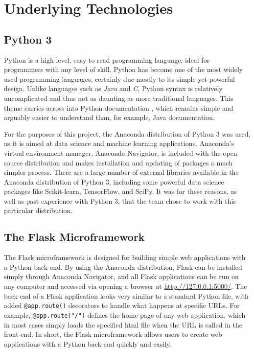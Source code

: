 \section{Underlying Technologies}\label{sectechnologies}

\subsection{Python 3}
Python is a high-level, easy to read programming language, ideal for programmers with any level of skill. Python has become one of the most widely used programming languages, certainly due mostly to its simple yet powerful design. Unlike languages such as \textit{Java} and \textit{C}, Python syntax is relatively uncomplicated and thus not as daunting as more traditional languages. This theme carries across into Python documentation \cite{pythondocs}, which remains simple and arguably easier to understand than, for example, Java documentation. 

For the purposes of this project, the Anaconda distribution \cite{anahome} of Python 3 was used, as it is aimed at data science and machine learning applications. Anaconda's virtual environment manager, Anaconda Navigator, is included with the open source distribution and makes installation and updating of packages a much simpler process. There are a large number of external libraries available in the Anaconda distribution of Python 3, including some powerful data science packages like Scikit-learn, TensorFlow, and SciPy. It was for these reasons, as well as past experience with Python 3, that the team chose to work with this particular distribution.

\subsection{The Flask Microframework}
The Flask microframework \cite{flaskhome} is designed for building simple web applications with a Python back-end. By using the Anaconda distribution, Flask can be installed simply through Anaconda Navigator, and all Flask applications can be run on any computer and accessed via opening a browser at \url{http://127.0.0.1:5000/}. The back-end of a Flask application looks very similar to a standard Python file, with added \texttt{@app.route()} decorators to handle what happens at specific URLs. For example, \texttt{@app.route("/")} defines the home page of any web application, which in most cases simply loads the specified html file when the URL is called in the front-end. In short, the Flask microframework allows users to create web applications with a Python back-end quickly and easily.

